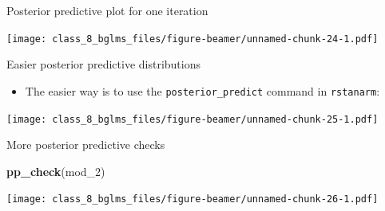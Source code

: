 \documentclass[ignorenonframetext,]{beamer}
\newenvironment{Shaded}{\begin{snugshade}}{\end{snugshade}}
\newcommand{\KeywordTok}[1]{\textcolor[rgb]{0.13,0.29,0.53}{\textbf{#1}}}
\newcommand{\DataTypeTok}[1]{\textcolor[rgb]{0.13,0.29,0.53}{#1}}
\newcommand{\DecValTok}[1]{\textcolor[rgb]{0.00,0.00,0.81}{#1}}
\newcommand{\StringTok}[1]{\textcolor[rgb]{0.31,0.60,0.02}{#1}}
\newcommand{\OperatorTok}[1]{\textcolor[rgb]{0.81,0.36,0.00}{\textbf{#1}}}
\newcommand{\NormalTok}[1]{#1}
\providecommand{\tightlist}{%
  \setlength{\itemsep}{0pt}\setlength{\parskip}{0pt}}
\begin{document}
\begin{frame}{Posterior predictive plot for one iteration}

\texttt{[image: class\_8\_bglms\_files/figure-beamer/unnamed-chunk-24-1.pdf]}

\end{frame}

\begin{frame}[fragile]{Easier posterior predictive distributions}

\begin{itemize}
\tightlist
\item
  The easier way is to use the \texttt{posterior\_predict} command in
  \texttt{rstanarm}:
\end{itemize}

\small

\begin{Shaded}
\end{Shaded}

\texttt{[image: class\_8\_bglms\_files/figure-beamer/unnamed-chunk-25-1.pdf]}

\end{frame}

\begin{frame}[fragile]{More posterior predictive checks}

\begin{Shaded}
\begin{Highlighting}[]
\KeywordTok{pp_check}\NormalTok{(mod_}\DecValTok{2}\NormalTok{)}
\end{Highlighting}
\end{Shaded}

\texttt{[image: class\_8\_bglms\_files/figure-beamer/unnamed-chunk-26-1.pdf]}

\end{frame}
\end{document}
